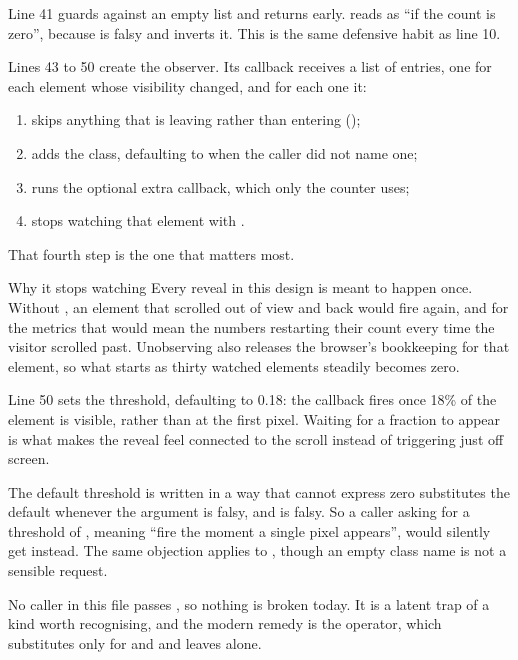 Line 41 guards against an empty list and returns early.  reads as
``if the count is zero'', because  is falsy and \code{!} inverts it. This
is the same defensive habit as line 10.

Lines 43 to 50 create the observer. Its callback receives a list of entries, one
for each element whose visibility changed, and for each one it:

\begin{enumerate}
\item skips anything that is leaving rather than entering
  ();
\item adds the class, defaulting to  when the caller did not name
  one;
\item runs the optional extra callback, which only the counter uses;
\item stops watching that element with .
\end{enumerate}

That fourth step is the one that matters most.

\begin{keyidea}{Why it stops watching}
Every reveal in this design is meant to happen once. Without , an
element that scrolled out of view and back would fire again, and for the metrics
that would mean the numbers restarting their count every time the visitor scrolled
past. Unobserving also releases the browser's bookkeeping for that element, so
what starts as thirty watched elements steadily becomes zero.
\end{keyidea}

Line 50 sets the threshold, defaulting to 0.18: the callback fires once 18\% of
the element is visible, rather than at the first pixel. Waiting for a fraction to
appear is what makes the reveal feel connected to the scroll instead of triggering
just off screen.

\begin{honest}{The default threshold is written in a way that cannot express zero}
 substitutes the default whenever the argument is falsy,
and  is falsy. So a caller asking for a threshold of , meaning
``fire the moment a single pixel appears'', would silently get 
instead. The same objection applies to , though an
empty class name is not a sensible request.

No caller in this file passes , so nothing is broken today. It is a latent
trap of a kind worth recognising, and the modern remedy is the  operator,
which substitutes only for  and  and leaves 
alone.
\end{honest}

